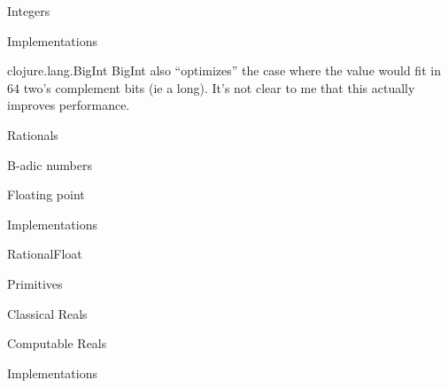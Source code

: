 \documentclass[12pt]{PalisadesLakesBook}
\begin{document}
\begin{plSection}{Integers}
\begin{plSection}{Implementations}
\begin{plSection}{\texorpdfstring{{\javaFont clojure.lang.BigInt}}{clojure.lang.BigInt}}
{\javaFont BigInt} also ``optimizes'' the case where the value
would fit in $64$ two's complement bits (ie a {\javaFont long}).
It's not clear to me that this actually improves performance.

\end{plSection}%
\end{plSection}%
\end{plSection}%
\begin{plSection}{Rationals}

\begin{plSection}{B-adic numbers}


\end{plSection}%
\begin{plSection}{Floating point}


\end{plSection}%
\begin{plSection}{Implementations}
\begin{plSection}{\texorpdfstring{\javaFont RationalFloat}{RationalFloat}}

\end{plSection}%
\begin{plSection}{Primitives}

\end{plSection}%
\end{plSection}%
\end{plSection}%
\begin{plSection}{Classical Reals}


\end{plSection}%
\begin{plSection}{Computable Reals}

\cite{Aberth:2001:ComputableCalculus,
BratkaHertlingWeihrauch:2008:TutorialComputableAnalysis,
Weihrauch:2000:ComputableAnalysis}

\begin{plSection}{Implementations}
\end{plSection}%
\end{plSection}%
%
\end{document}
